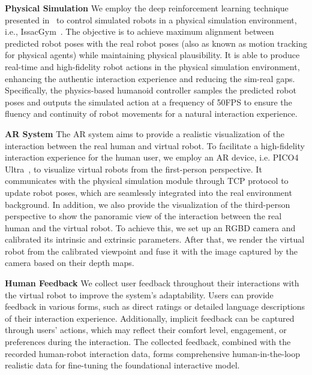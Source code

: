 \textbf{Physical Simulation} 
We employ the deep reinforcement learning technique presented in~\cite{luo2023perpetual} to control simulated robots in a physical simulation environment, i.e., IssacGym~\cite{makoviychuk2021isaac}. The objective is to achieve maximum alignment between predicted robot poses with the real robot poses (also as known as motion tracking for physical agents) while maintaining physical plausibility. It is able to produce real-time and high-fidelity robot actions in the physical simulation environment, enhancing the authentic interaction experience and reducing the sim-real gaps. Specifically, the physics-based humanoid controller samples the predicted robot poses and outputs the simulated action at a frequency of 50FPS to ensure the fluency and continuity of robot movements for a natural interaction experience.

\textbf{AR System} The AR system aims to provide a realistic visualization of the interaction between the real human and virtual robot. To facilitate a high-fidelity interaction experience for the human user, we employ an AR device, i.e. PICO4 Ultra~\cite{PicoInteractive2022}, to visualize virtual robots from the first-person perspective. It communicates with the physical simulation module through TCP protocol to update robot poses, which are seamlessly integrated into the real environment background. In addition, we also provide the visualization of the third-person perspective to show the panoramic view of the interaction between the real human and the virtual robot. To achieve this, we set up an RGBD camera and calibrated its intrinsic and extrinsic parameters. After that, we render the virtual robot from the calibrated viewpoint and fuse it with the image captured by the camera based on their depth maps.
 
\textbf{Human Feedback} 
We collect user feedback throughout their interactions with the virtual robot to improve the system's adaptability. Users can provide feedback in various forms, such as direct ratings or detailed language descriptions of their interaction experience. Additionally, implicit feedback can be captured through users' actions, which may reflect their comfort level, engagement, or preferences during the interaction. The collected feedback, combined with the recorded human-robot interaction data, forms comprehensive human-in-the-loop realistic data for fine-tuning the foundational interactive model.

